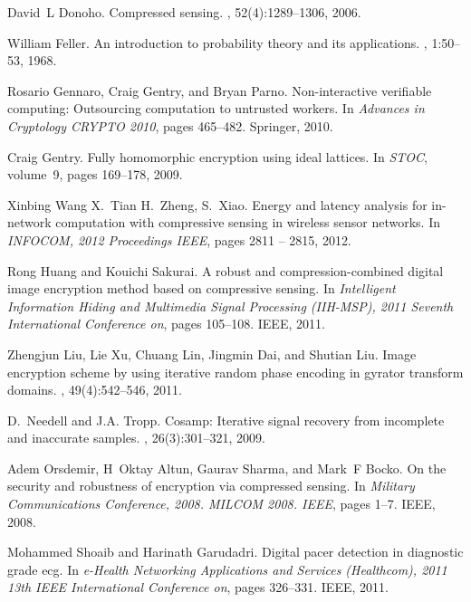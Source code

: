 \documentclass[conference]{IEEEtran}
\begin{document}
\begin{thebibliography}{10}
David~L Donoho.
\newblock Compressed sensing.
, 52(4):1289--1306,
  2006.

William Feller.
\newblock An introduction to probability theory and its applications.
, 1:50--53, 1968.

Rosario Gennaro, Craig Gentry, and Bryan Parno.
\newblock Non-interactive verifiable computing: Outsourcing computation to
  untrusted workers.
\newblock In {\em Advances in Cryptology CRYPTO 2010}, pages 465--482.
  Springer, 2010.

Craig Gentry.
\newblock Fully homomorphic encryption using ideal lattices.
\newblock In {\em STOC}, volume~9, pages 169--178, 2009.

Xinbing Wang X.~Tian H.~Zheng, S.~Xiao.
\newblock Energy and latency analysis for in-network computation with
  compressive sensing in wireless sensor networks.
\newblock In {\em INFOCOM, 2012 Proceedings IEEE}, pages 2811 -- 2815, 2012.

Rong Huang and Kouichi Sakurai.
\newblock A robust and compression-combined digital image encryption method
  based on compressive sensing.
\newblock In {\em Intelligent Information Hiding and Multimedia Signal
  Processing (IIH-MSP), 2011 Seventh International Conference on}, pages
  105--108. IEEE, 2011.

Zhengjun Liu, Lie Xu, Chuang Lin, Jingmin Dai, and Shutian Liu.
\newblock Image encryption scheme by using iterative random phase encoding in
  gyrator transform domains.
, 49(4):542--546, 2011.

D.~Needell and J.A. Tropp.
\newblock Cosamp: Iterative signal recovery from incomplete and inaccurate
  samples.
, 26(3):301--321,
  2009.

Adem Orsdemir, H~Oktay Altun, Gaurav Sharma, and Mark~F Bocko.
\newblock On the security and robustness of encryption via compressed sensing.
\newblock In {\em Military Communications Conference, 2008. MILCOM 2008. IEEE},
  pages 1--7. IEEE, 2008.

Mohammed Shoaib and Harinath Garudadri.
\newblock Digital pacer detection in diagnostic grade ecg.
\newblock In {\em e-Health Networking Applications and Services (Healthcom),
  2011 13th IEEE International Conference on}, pages 326--331. IEEE, 2011.


\end{thebibliography}
\end{document}
